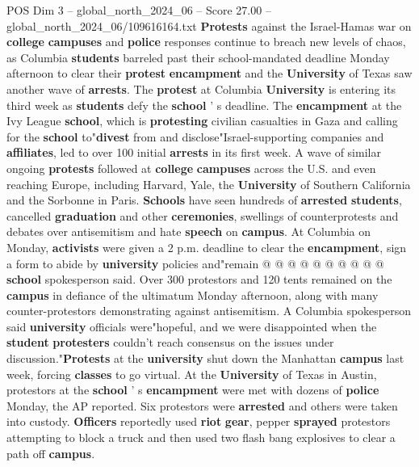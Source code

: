 \begin{textsample}{POS Dim 3 – global\_north\_2024\_06 – Score 27.00 – global\_north\_2024\_06/109616164.txt}  \label{ex:f3_pos_062}
\textbf{Protests} against the Israel-Hamas war on \textbf{college} \textbf{campuses} and \textbf{police} responses continue to breach new levels of chaos, as Columbia \textbf{students} barreled past their school-mandated deadline Monday afternoon to clear their \textbf{protest} \textbf{encampment} and the \textbf{University} of Texas saw another wave of \textbf{arrests}.
The \textbf{protest} at Columbia \textbf{University} is entering its third week as \textbf{students} defy the \textbf{school} ' s deadline.
The \textbf{encampment} at the Ivy League \textbf{school}, which is \textbf{protesting} civilian casualties in Gaza and calling for the \textbf{school} to"\textbf{divest} from and disclose"Israel-supporting companies and \textbf{affiliates}, led to over 100 initial \textbf{arrests} in its first week.
A wave of similar ongoing \textbf{protests} followed at \textbf{college} \textbf{campuses} across the U.S. and even reaching Europe, including Harvard, Yale, the \textbf{University} of Southern California and the Sorbonne in Paris. \textbf{Schools} have seen hundreds of \textbf{arrested} \textbf{students}, cancelled \textbf{graduation} and other \textbf{ceremonies}, swellings of counterprotests and debates over antisemitism and hate \textbf{speech} on \textbf{campus}.
At Columbia on Monday, \textbf{activists} were given a 2 p.m. deadline to clear the \textbf{encampment}, sign a form to abide by \textbf{university} policies and"remain @ @ @ @ @ @ @ @ @ @ \textbf{school} spokesperson said.
Over 300 protestors and 120 tents remained on the \textbf{campus} in defiance of the ultimatum Monday afternoon, along with many counter-protestors demonstrating against antisemitism.
A Columbia spokesperson said \textbf{university} officials were"hopeful, and we were disappointed when the \textbf{student} \textbf{protesters} couldn't reach consensus on the issues under discussion."\textbf{Protests} at the \textbf{university} shut down the Manhattan \textbf{campus} last week, forcing \textbf{classes} to go virtual.
At the \textbf{University} of Texas in Austin, protestors at the \textbf{school} ' s \textbf{encampment} were met with dozens of \textbf{police} Monday, the AP reported.
Six protestors were \textbf{arrested} and others were taken into custody. \textbf{Officers} reportedly used \textbf{riot} \textbf{gear}, pepper \textbf{sprayed} protestors attempting to block a truck and then used two flash bang explosives to clear a path off \textbf{campus}.

\end{textsample}
